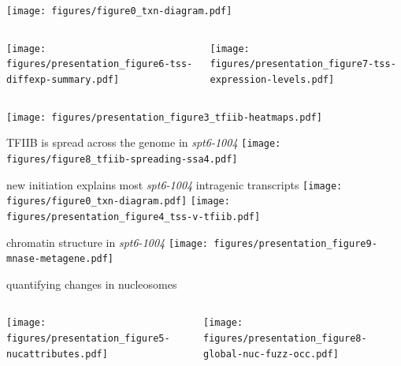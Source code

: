 \documentclass[aspectratio=169]{beamer}
\begin{document}
\begin{frame}
    \centering
    \texttt{[image: figures/figure0\_txn-diagram.pdf]}
    \begin{columns}
        \begin{column}{0.5\textwidth}
            \centering
            \texttt{[image: figures/presentation\_figure6-tss-diffexp-summary.pdf]}
        \end{column}
        \begin{column}{0.5\textwidth}
            \centering
            \pause
            \texttt{[image: figures/presentation\_figure7-tss-expression-levels.pdf]}
        \end{column}
    \end{columns}
\end{frame}

\begin{frame}
\centering
\texttt{[image: figures/presentation\_figure3\_tfiib-heatmaps.pdf]}
\end{frame}

\begin{frame}{TFIIB is spread across the genome in \textit{spt6-1004}}
\texttt{[image: figures/figure8\_tfiib-spreading-ssa4.pdf]}
\end{frame}

\begin{frame}{new initiation explains most \textit{spt6-1004} intragenic transcripts}
    \centering
    \texttt{[image: figures/figure0\_txn-diagram.pdf]}
    \texttt{[image: figures/presentation\_figure4\_tss-v-tfiib.pdf]}
\end{frame}

\begin{frame}{chromatin structure in \textit{spt6-1004}}
\texttt{[image: figures/presentation\_figure9-mnase-metagene.pdf]}
\end{frame}

\begin{frame}{quantifying changes in nucleosomes}
    \begin{columns}
        \begin{column}{0.5\textwidth}
            \centering
            \texttt{[image: figures/presentation\_figure5-nucattributes.pdf]}
        \end{column}
        \begin{column}{0.5\textwidth}
            \centering
            \texttt{[image: figures/presentation\_figure8-global-nuc-fuzz-occ.pdf]}
        \end{column}
    \end{columns}
\end{frame}
\end{document}
